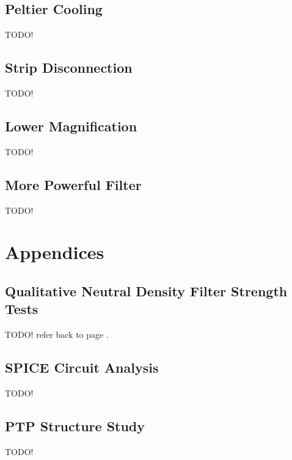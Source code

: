 \documentclass{report}
\begin{document}
        \section{Peltier Cooling}
            TODO!

        \section{Strip Disconnection}
            TODO!

        \section{Lower Magnification}
            TODO!

        \section{More Powerful Filter} \label{sect:new_filters}
            TODO!





    \chapter{Appendices}
        \section{Qualitative Neutral Density Filter Strength Tests} \label{sect:filter_tests}
            TODO! refer back to page \pageref{page:504_to_black_filter}.

        \section{SPICE Circuit Analysis}
            TODO!

        \section{PTP Structure Study} \label{sect:ptp_study}
            TODO!
\end{document}
